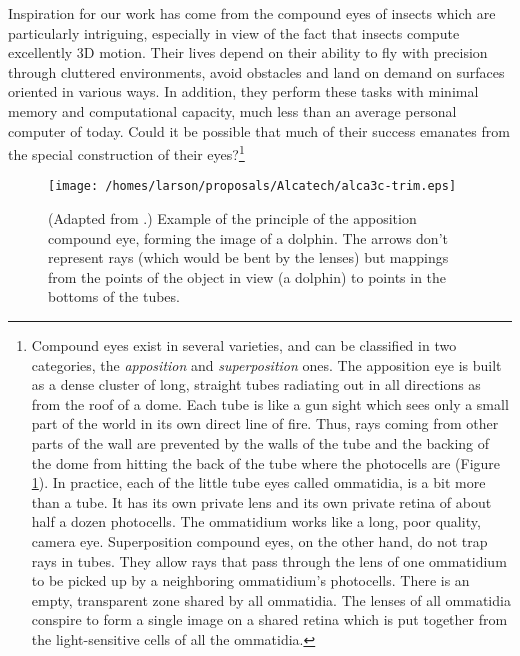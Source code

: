 \documentclass[10pt,twocolumn]{article}
\begin{document}
Inspiration for our work has come from the compound eyes of insects
which are particularly intriguing, especially in view of the fact that
insects compute excellently 3D motion. Their lives depend on their
ability to fly with precision through cluttered environments, avoid
obstacles and land on demand on surfaces oriented in various ways. In
addition, they perform these tasks with minimal memory and
computational capacity, much less than an average personal computer of
today. Could it be possible that much of their success emanates from
the special construction of their eyes?\footnote{Compound eyes exist
in several varieties, and can be classified in two categories, the
\emph{apposition} and \emph{superposition} ones. The apposition eye is
built as a dense cluster of long, straight tubes radiating out in all
directions as from the roof of a dome. Each tube is like a gun sight
which sees only a small part of the world in its own direct line of
fire. Thus, rays coming from other parts of the wall are prevented by
the walls of the tube and the backing of the dome from hitting the
back of the tube where the photocells are (Figure \ref{apposition}).
In practice, each of the little tube eyes called ommatidia, is a bit
more than a tube.  It has its own private lens and its own private
retina of about half a dozen photocells. The ommatidium works like a
long, poor quality, camera eye. Superposition compound eyes, on the
other hand, do not trap rays in tubes. They allow rays that pass
through the lens of one ommatidium to be picked up by a neighboring
ommatidium's photocells. There is an empty, transparent zone shared by
all ommatidia. The lenses of all ommatidia conspire to form a single
image on a shared retina which is put together from the
light-sensitive cells of all the ommatidia.}

\begin{figure}[htbp]
  \centering\texttt{[image: /homes/larson/proposals/Alcatech/alca3c-trim.eps]}
  \caption{(Adapted from \cite{dawkins}.) Example of the principle of
  the apposition compound eye, forming the image of a dolphin.  The
  arrows don't represent rays (which would be bent by the lenses) but
  mappings from the points of the object in view (a dolphin) to points
  in the bottoms of the tubes. }
  \label{apposition}
\end{figure}
\end{document}

